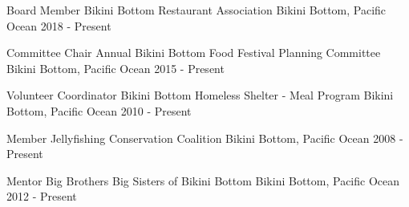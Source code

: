\begin{cvhonors}

  \cvhonor
    {Board Member} %
    {Bikini Bottom Restaurant Association} %
    {Bikini Bottom, Pacific Ocean} %
    {2018 - Present} %

  \cvhonor
    {Committee Chair} %
    {Annual Bikini Bottom Food Festival Planning Committee} %
    {Bikini Bottom, Pacific Ocean} %
    {2015 - Present} %

  \cvhonor
    {Volunteer Coordinator} %
    {Bikini Bottom Homeless Shelter - Meal Program} %
    {Bikini Bottom, Pacific Ocean} %
    {2010 - Present} %

  \cvhonor
    {Member} %
    {Jellyfishing Conservation Coalition} %
    {Bikini Bottom, Pacific Ocean} %
    {2008 - Present} %

  \cvhonor
    {Mentor} %
    {Big Brothers Big Sisters of Bikini Bottom} %
    {Bikini Bottom, Pacific Ocean} %
    {2012 - Present} %

\end{cvhonors}
